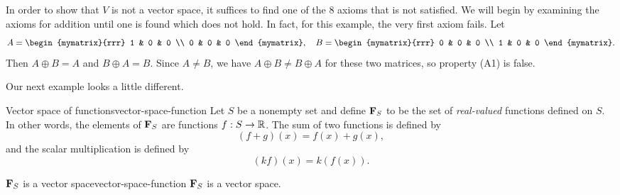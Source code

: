 \begin{solution}
  In order to show that $V$ is not a vector space, it suffices to find
  one of the 8 axioms that is not satisfied. We will begin by examining
  the axioms for addition until one is found which does not hold. In
  fact, for this example, the very first axiom fails. Let
  \begin{equation*}
    A = \begin{mymatrix}{rrr}
      1 & 0 & 0 \\
      0 & 0 & 0
    \end{mymatrix},
    \quad
    B = \begin{mymatrix}{rrr}
      0 & 0 & 0 \\
      1 & 0 & 0
    \end{mymatrix}.
  \end{equation*}
  Then $A\oplus B=A$ and $B\oplus A=B$. Since $A\neq B$, we have
  $A\oplus B\neq B\oplus A$ for these two matrices, so property (A1)
  is false. 
\end{solution}

Our next example looks a little different. 

\begin{example}{Vector space of functions}{vector-space-function}
  Let $S$ be a nonempty set and define $\mathbf{F}_S$%
   to be the set of \textit{real-valued}
  functions%
   defined on $S$. In other words, the
  elements of $\mathbf{F}_S$ are functions $f:S\to\mathbb{R}$. The sum of two
  functions is defined by
  \begin{equation*}
    (f + g)(x) = f(x) + g(x),
  \end{equation*}
  and the scalar multiplication is defined by
  \begin{equation*}
    (kf) (x) = k(f(x)).
  \end{equation*}
\end{example}

\begin{proposition}{$\mathbf{F}_S$ is a vector space}{vector-space-function}
  $\mathbf{F}_S$ is a vector space.
\end{proposition}

